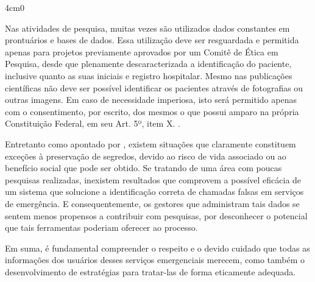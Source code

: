 \renewenvironment{quote}[1][1em]
  {\begin{adjustwidth}{#1}{0}}
  {\end{adjustwidth}}
\begin{quote}[4cm]
\begin{singlespace}
{\footnotesize  
Nas atividades de pesquisa, muitas vezes são utilizados dados constantes em prontuários e bases de dados. Essa utilização deve ser resguardada e permitida apenas para projetos previamente aprovados por um Comitê de Ética em Pesquisa, desde que plenamente descaracterizada a identificação do paciente, inclusive quanto as suas iniciais e registro hospitalar. Mesmo nas publicações científicas não deve ser possível identificar os pacientes através de fotografias ou outras imagens. Em caso de necessidade imperiosa, isto será permitido apenas com o consentimento, por escrito, dos mesmos o que possui amparo na própria Constituição Federal, em seu Art. 5º, item X. \citep{francisconi1998aspectos}.
}
\end{singlespace}
\end{quote}

Entretanto como apontado por \cite{francisconi1998aspectos}, existem situações que claramente constituem exceções à preservação de segredos, devido ao risco de vida associado ou ao benefício social que pode ser obtido. Se tratando de uma área com poucas pesquisas realizadas, inexistem resultados que comprovem a possível eficácia de um sistema que solucione a identificação correta de chamadas falsas em serviços de emergência. E consequentemente, os gestores que administram tais dados se sentem menos propensos a contribuir com pesquisas, por desconhecer o potencial que tais ferramentas poderiam oferecer ao processo.

Em suma, é fundamental compreender o respeito e o devido cuidado que todas as informações dos usuários desses serviços emergenciais merecem, como também o desenvolvimento de estratégias para tratar-las de forma eticamente adequada.